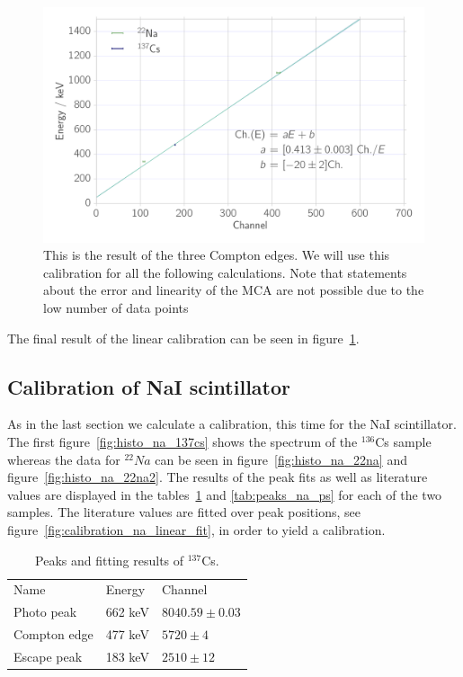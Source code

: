 \begin{figure}[htpb]
    \centering
    \includegraphics[width=0.9\linewidth]{./analysis/figures/calibration_ps_linear_fit}
    \caption{This is the result of the three Compton edges. We will use this calibration
    for all the following calculations. Note that statements about the error and linearity of the MCA 
    are not possible due to the low number of data points}
\label{fig:calibration_ps_linear_fit}
\end{figure}
The final result of the linear calibration can be seen in
figure~\ref{fig:calibration_ps_linear_fit}.

\subsection{Calibration of NaI scintillator}

\label{sub:calibration_of_na_scintillator}
As in the last section we calculate a calibration, this time for the NaI scintillator. The
first figure~\ref{fig:histo_na_137cs} shows the spectrum of the $^{136}$Cs sample 
whereas the data for
$^{22}Na$ can be seen in figure~\ref{fig:histo_na_22na} and figure~\ref{fig:histo_na_22na2}.
The results of the peak fits as well as literature values are displayed in the tables~\ref{tab:peaks_cs_ps}
and \ref{tab:peaks_na_ps} for each of the two samples. The literature values are fitted over peak positions, see 
figure~\ref{fig:calibration_na_linear_fit}, in order to yield a calibration. 
\begin{table}[htpb]
    \centering
    \caption{Peaks and fitting results of $^{137}$Cs.}
\label{tab:peaks_cs_ps}
    \begin{tabular}{lll}
        \rowcolor{LightCyan} Name &Energy & Channel \\ 
        Photo peak & 662 keV & $8040.59 \pm 0.03$\\ 
        Compton edge & 477 keV & $5720 \pm 4$\\  
        Escape peak & 183 keV & $2510 \pm 12$
    \end{tabular}
\end{table}

